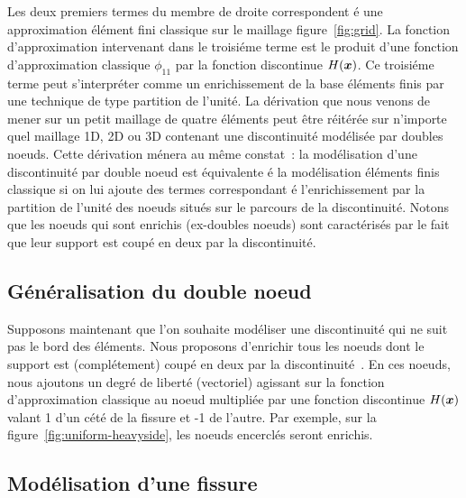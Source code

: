 Les deux premiers termes du membre de droite correspondent
\'e une approximation \'el\'ement fini classique sur le maillage
figure~\ref{fig:grid}. La fonction d'approximation
intervenant dans le
troisi\'eme terme est le produit d'une fonction d'approximation
classique
$\phi_{11}$ par la fonction discontinue $H(\mbox{\boldmath $x$})$.
Ce troisi\'eme terme
peut s'interpr\'eter comme un enrichissement de la base
\'el\'ements finis par une technique de type partition de l'unit\'e.
La d\'erivation que nous venons de mener sur un petit maillage de
quatre \'el\'ements peut \^etre r\'eit\'er\'ee sur n'importe
quel  maillage 1D, 2D ou 3D contenant une discontinuit\'e
mod\'elis\'ee par doubles noeuds. Cette d\'erivation m\'enera au m\^eme
constat~: la mod\'elisation d'une discontinuit\'e par double noeud
est \'equivalente \'e la mod\'elisation \'el\'ements finis classique
si on lui ajoute des termes correspondant \'e l'enrichissement
par la partition de l'unit\'e
des noeuds situ\'es sur le parcours de la discontinuit\'e.
Notons que les noeuds qui sont enrichis (ex-doubles noeuds)
sont caract\'eris\'es par le
fait que leur support est coup\'e en deux par la discontinuit\'e.

\subsection{G\'en\'eralisation du double noeud}
Supposons maintenant que l'on souhaite mod\'eliser une discontinuit\'e
qui ne suit pas le bord des \'el\'ements. Nous
proposons d'enrichir
tous les noeuds dont le support est (compl\'etement) coup\'e en deux
par la  discontinuit\'e~\cite{Moes:discont}.
En ces noeuds, nous ajoutons un degr\'e
de libert\'e (vectoriel) agissant sur la fonction d'approximation classique
au noeud multipli\'ee par une fonction discontinue $H(\mbox{\boldmath $x$})$ valant 1 d'un
c\'et\'e de la fissure et -1 de l'autre.
Par exemple, sur la figure~\ref{fig:uniform-heavyside}, les noeuds encercl\'es seront enrichis.



\subsection{Mod\'elisation d'une fissure}

